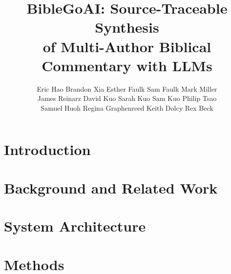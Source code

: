 \documentclass[11pt,twocolumn]{article}
\title{\textbf{BibleGoAI: Source-Traceable Synthesis\\[0.3em]
of Multi-Author Biblical Commentary with LLMs}}
\author{
  Eric Hao \quad Brandon Xia \quad Esther Faulk \quad Sam Faulk \quad Mark Miller\\[0.3em]
  James Reinarz \quad David Kuo \quad Sarah Kuo \quad Sam Kuo \quad Philip Tsao\\[0.3em]
  Samuel Huoh \quad Regina Graphenreed \quad Keith Dolcy \quad Rex Beck
}
\date{}
\begin{document}
\raggedbottom

\renewcommand{\topfraction}{0.85}
\renewcommand{\bottomfraction}{0.85}
\renewcommand{\textfraction}{0.10}
\renewcommand{\floatpagefraction}{0.75}
\setcounter{topnumber}{3}
\setcounter{bottomnumber}{3}
\setcounter{totalnumber}{6}

\maketitle

\begin{abstract}

\end{abstract}

\section{Introduction}
\label{sec:introduction}


\section{Background and Related Work}
\label{sec:related}


\section{System Architecture}
\label{sec:architecture}


\section{Methods}
\label{sec:methods}

\end{document}
